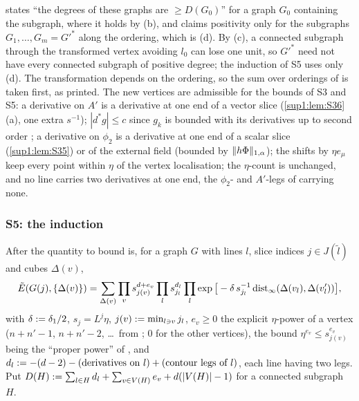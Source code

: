 \begin{remark}\label{sup1:rem:S4scope}
\cite[p.~425]{Ba3} states ``the degrees of these graphs are $\ge D(G_0)$'' for a graph $G_0$ containing the \cite[(2.4)]{Ba3} subgraph, where it holds by (b), and claims positivity only for the subgraphs $G_1,\dots,G_m=G'^*$ along the ordering, which is (d). By (c), a connected subgraph through the transformed vertex avoiding $l_0$ can lose one unit, so $G'^*$ need not have every connected subgraph of positive degree; the induction of S5 uses only (d). The transformation depends on the ordering, so the sum over orderings of \cite[(2.7)]{Ba3} is taken first, as printed. The new vertices are admissible for the bounds of S3 and S5: a derivative on $A'$ is a derivative at one end of a vector slice (\cref{sup1:lem:S36}(a), one extra $s^{-1}$); $|d^*g|\le c$ since $g_k$ is bounded with its derivatives up to second order \cite[p.~412]{Ba3}; a derivative on $\phi_2$ is a derivative at one end of a scalar slice (\cref{sup1:lem:S35}) or of the external field (bounded by $\lVert h\Phi\rVert_{1,\alpha}$); the shifts by $\eta e_\mu$ keep every point within $\eta$ of the vertex localisation; the $\eta$-count is unchanged, and no line carries two derivatives at one end, the $\phi_2$- and $A'$-legs of \cite[(1.8)]{Ba3} carrying none.
\end{remark}

\subsubsection{S5: the induction \cite[(2.16)]{Ba3}}\label{sup1:ssec:S5}

After \cite[(2.13)--(2.14)]{Ba3} the quantity to bound is, for a graph $G$ with lines $l$, slice indices $j\in J(\tilde l)$ and cubes $\Delta(v)$,
\begin{equation}\label{sup1:eq:214}
\tilde E(G(j),\{\Delta(v)\})=\sum_{\Delta(v)}\prod_vs_{j(v)}^{d+e_v}\prod_ls_{j_l}^{d_l}\prod_l\exp\big[-\delta\,s_{j_l}^{-1}\operatorname{dist}_\infty(\Delta(v_l),\Delta(v'_l))\big],
\end{equation}
with $\delta:=\delta_1/2$, $s_j=L^j\eta$, $j(v):=\min_{l\ni v}j_l$, $e_v\ge0$ the explicit $\eta$-power of a vertex \cite[(1.8)--(1.11)]{Ba3} ($n+n'-1$, $n+n'-2$, \dots\ from \cite[p.~413]{Ba3}; $0$ for the other vertices), the bound $\eta^{e_v}\le s_{j(v)}^{e_v}$ being the ``proper power'' of \cite[(2.14)]{Ba3}, and $d_l:=-(d-2)-(\text{derivatives on }l)+(\text{contour legs of }l)$, each line having two legs. Put $D(H):=\sum_{l\in H}d_l+\sum_{v\in V(H)}e_v+d(|V(H)|-1)$ for a connected subgraph $H$.

